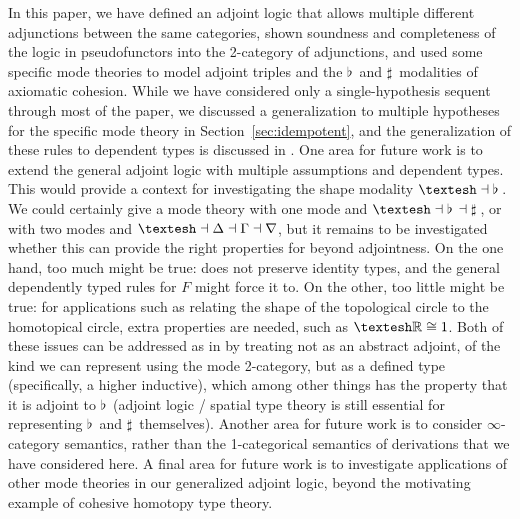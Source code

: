 \documentclass{drl-common/llncs}
\newcommand{\la}{\ensuremath{\dashv}}
\newcommand{\sh}{\text{\textesh}}
\newcommand\Flat[1]{\ensuremath{\flat \, {#1}}}
\newcommand\Sharp[1]{\ensuremath{\sharp \, {#1}}}
\begin{document}
In this paper, we have defined an adjoint logic that allows multiple
different adjunctions between the same categories, shown soundness and
completeness of the logic in pseudofunctors into the 2-category of
adjunctions, and used some specific mode theories to model adjoint
triples and the $\Flat{}$ and $\Sharp{}$ modalities of axiomatic
cohesion.  While we have considered only a single-hypothesis sequent
through most of the paper, we discussed a generalization to multiple
hypotheses for the specific mode theory in Section~\ref{sec:idempotent},
and the generalization of these rules to dependent types is discussed in
\citet{shulman15realcohesion}.  One area for future work is to extend
the general adjoint logic with multiple assumptions and dependent types.
This would provide a context for investigating the shape modality $\sh{}
\la \Flat{}$.  We could certainly give a mode theory with one mode and
$\sh{} \la \Flat{} \la \Sharp{}$, or with two modes and $\sh \la \Delta
\la \Gamma \la \nabla$, but it remains to be investigated whether this
can provide the right properties for \sh{} beyond adjointness.  On the
one hand, too much might be true: \sh{} does not preserve identity
types, and the general dependently typed rules for $F$ might force it
to. On the other, too little might be true: for applications such as
relating the shape of the topological circle to the homotopical circle,
extra properties are needed, such as $\sh{\mathbb{R}} \cong 1$.  Both of
these issues can be addressed as in \citep{shulman15realcohesion} by
treating \sh{} not as an abstract adjoint, of the kind we can represent
using the mode 2-category, but as a defined type (specifically, a higher
inductive), which among other things has the property that it is adjoint
to $\Flat{}$ (adjoint logic / spatial type theory is still essential for
representing $\Flat{}$ and $\Sharp{}$ themselves).  Another area for
future work is to consider $\infty$-category semantics, rather than the
1-categorical semantics of derivations that we have considered here.  A
final area for future work is to investigate applications of other mode
theories in our generalized adjoint logic, beyond the motivating
example of cohesive homotopy type theory.

{ %


}
\end{document}
